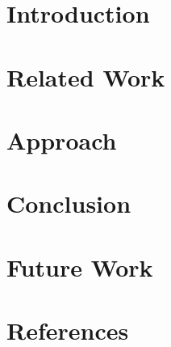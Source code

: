 \documentclass[a4paper]{scrartcl}
\begin{document}

\newpage

\newpage

\newpage

\newpage
\tableofcontents
\newpage
\section{Introduction}
% 
\section{Related Work}
\section{Approach}



 
 

\section{Conclusion}
\section{Future Work}
\newpage
\section*{References}
\renewcommand\refname{}


\newpage
\listoftodos[Notes] %
\end{document}
